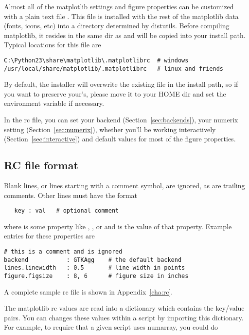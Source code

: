 \documentclass[twoside]{book}
\begin{document}
Almost all of the matplotlib settings and figure properties can be
customized with a plain text file .  This file is
installed with the rest of the matplotlib data (fonts, icons, etc)
into a directory determined by distutils.  Before compiling
matplotlib, it resides in the same dir as  and will be
copied into your install path.  Typical locations for this file are

\begin{verbatim}
C:\Python23\share\matplotlib\.matplotlibrc  # windows
/usr/local/share/matplotlib/.matplotlibrc   # linux and friends  
\end{verbatim}

\noindent By default, the installer will overwrite the existing file in
the install path, so if you want to preserve your's, please move it to
your HOME dir and set the environment variable if necessary.

In the rc file, you can set your backend (Section~\ref{sec:backends}),
your numerix setting (Section~\ref{sec:numerix}), whether you'll be
working interactively (Section~\ref{sec:interactive}) and default
values for most of the figure properties.  


\subsection{RC file format}

Blank lines, or lines starting with a comment symbol, are ignored,
as are trailing comments.  Other lines must have the format

\begin{lstlisting}
   key : val   # optional comment
\end{lstlisting}

\noindent where  is some property like ,
, or  and  is the value
of that property.  Example entries for these properties are

\begin{lstlisting}
# this is a comment and is ignored
backend           : GTKAgg    # the default backend
lines.linewidth   : 0.5       # line width in points
figure.figsize    : 8, 6      # figure size in inches
\end{lstlisting}

\noindent A complete sample rc file is shown in Appendix~\ref{cha:rc}.

The matplotlib rc values are read into a dictionary  which
contains the key/value pairs.  You can changes these values within a
script by importing this dictionary.  For example, to require that a
given script uses numarray, you could do
\end{document}
